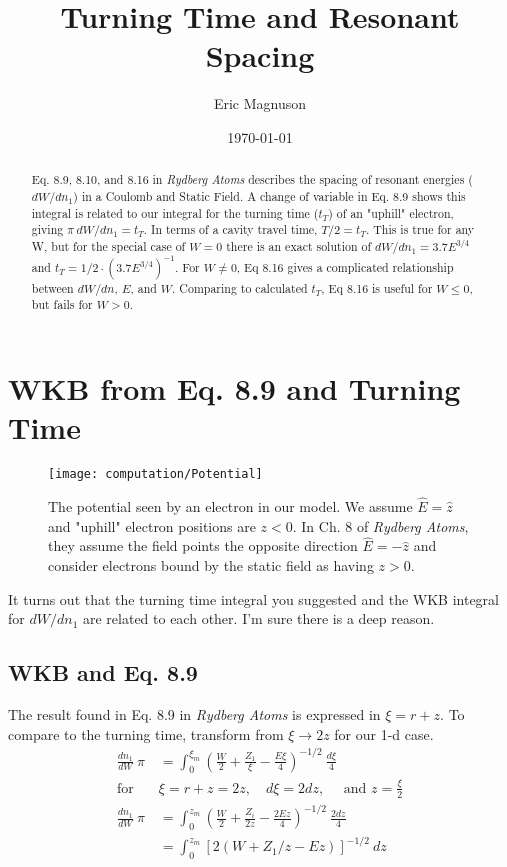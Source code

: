 \documentclass[aps,pra,preprint,groupedaddress]{revtex4-1}
\begin{document}
\title{Turning Time and Resonant Spacing}

\author{Eric Magnuson}
\date{\today}

\begin{abstract}
Eq. 8.9, 8.10, and 8.16 in \emph{Rydberg Atoms} describes the spacing of resonant energies ($dW/dn_1$) in a Coulomb and Static Field. A change of variable in Eq. 8.9 shows this integral is related to our integral for the turning time ($t_T$) of an "uphill" electron, giving $\pi ~ dW/dn_1 = t_T$. In terms of a cavity travel time, $T/2 = t_T$. This is true for any W, but for the special case of $W = 0$ there is an exact solution of $dW/dn_1 = 3.7 E^{3/4}$ and $t_T = 1/2 \cdot (3.7 E^{3/4})^{-1}$. For $W \neq 0$, Eq 8.16 gives a complicated relationship between $dW/dn$, $E$, and $W$. Comparing to calculated $t_T$, Eq 8.16 is useful for $W \leq 0$, but fails for $W > 0$.
\end{abstract}

\maketitle

\section{\label{sec:WKBtt} WKB from Eq. 8.9 and Turning Time}

\begin{figure}
\texttt{[image: computation/Potential]}
\caption{\label{fig:pot} The potential seen by an electron in our model. We assume $\hat{E} = \hat{z}$ and "uphill" electron positions are $z < 0$. In Ch. 8 of \emph{Rydberg Atoms}, they assume the field points the opposite direction $\hat{E} = - \hat{z}$ and consider electrons bound by the static field as having $z > 0$.}
\end{figure}

It turns out that the turning time integral you suggested and the WKB integral for $dW/dn_1$ are related to each other. I'm sure there is a deep reason.

\subsection{\label{sec:WKB} WKB and Eq. 8.9 }

The result found in Eq. 8.9 in \emph{Rydberg Atoms} is expressed in $\xi = r + z$. To compare to the turning time, transform from $\xi \rightarrow 2z$ for our 1-d case.
\begin{align*}
\frac{dn_1}{dW} ~ \pi & = \int_0^{\xi_m} \left( \frac{W}{2} + \frac{Z_1}{\xi} - \frac{E\xi}{4} \right)^{-1/2} ~ \frac{d\xi}{4} \\
\text{for} \quad & \xi = r + z = 2z , \quad d\xi = 2 dz , \quad \text{ and } z = \frac{\xi}{2} \\
\frac{dn_1}{dW} ~ \pi & = \int_0^{z_m} \left( \frac{W}{2} + \frac{Z_i}{2z} - \frac{2Ez}{4} \right)^{-1/2} ~ \frac{2 dz}{4} \\
 & = \int_0^{z_m} [2(W + Z_1 / z - Ez)]^{-1/2} ~ dz
\end{align*}
\end{document}
